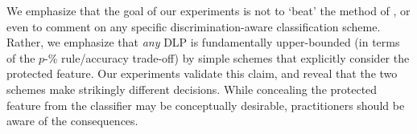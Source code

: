 We emphasize that the goal of our experiments 
is not to `beat' the method of \citep{zafar2017fairness}, 
or even to comment on any specific discrimination-aware classification scheme. 
Rather, we emphasize that \emph{any} DLP
is fundamentally upper-bounded 
(in terms of the $p$-\% rule/accuracy trade-off) 
by simple schemes that explicitly consider the protected feature. 
Our experiments validate this claim, 
and reveal that %
the two schemes make strikingly different decisions. 
While concealing the protected feature 
from the classifier may be conceptually desirable, 
practitioners should be aware of the consequences. 

